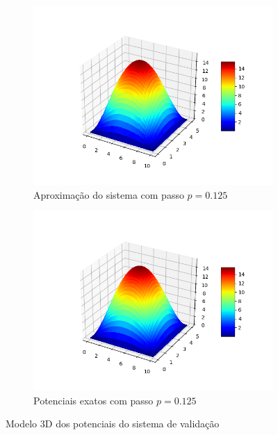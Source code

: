 \documentclass[oneside]{abntex2}
\begin{document}
\begin{figure}[h]
  \begin{subfigure}[b]{0.5\textwidth}
    \includegraphics[width=\textwidth]{imgs/3d_aprox_val_1250.png}
    \caption{Aproximação do sistema com passo $p = 0.125$}
    \label{3d_aprox_val_1250}
  \end{subfigure}
  \begin{subfigure}[b]{0.5\textwidth}
    \includegraphics[width=\textwidth]{imgs/3d_grnd_val_1250.png}
    \caption{Potenciais exatos com passo $p = 0.125$}
    \label{3d_exat_val_1250}
  \end{subfigure}
  \caption{Modelo 3D dos potenciais do sistema de validação}
\end{figure}
\end{document}
